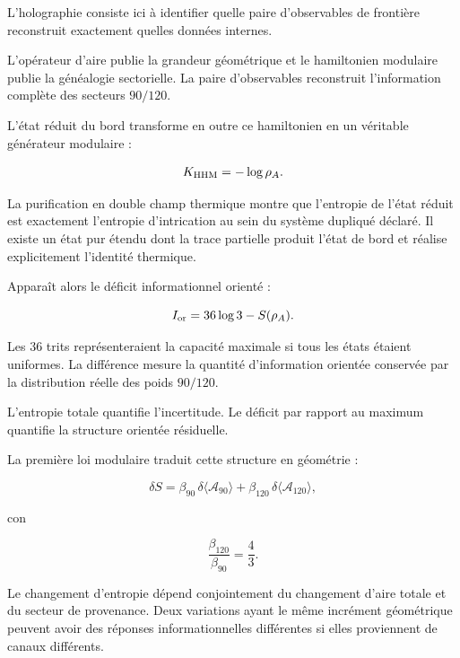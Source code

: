 L'holographie consiste ici à identifier quelle paire d'observables de frontière reconstruit exactement quelles données internes.\par

L'opérateur d'aire publie la grandeur géométrique et le hamiltonien modulaire publie la généalogie sectorielle. La paire d'observables reconstruit l'information complète des secteurs \(90/120\).\par

L'état réduit du bord transforme en outre ce hamiltonien en un véritable générateur modulaire :\par

\[
K_{\rm HHM}=-\log\rho_A.
\]

La purification en double champ thermique montre que l'entropie de l'état réduit est exactement l'entropie d'intrication au sein du système dupliqué déclaré. Il existe un état pur étendu dont la trace partielle produit l'état de bord et réalise explicitement l'identité thermique.\par

Apparaît alors le déficit informationnel orienté :\par

\[
I_{\rm or}
=
36\log3-S(\rho_A).
\]

Les \(36\) trits représenteraient la capacité maximale si tous les états étaient uniformes. La différence mesure la quantité d'information orientée conservée par la distribution réelle des poids \(90/120\).\par

L'entropie totale quantifie l'incertitude. Le déficit par rapport au maximum quantifie la structure orientée résiduelle.\par

La première loi modulaire traduit cette structure en géométrie :\par

\[
\delta S
=
\beta_{90}\,
\delta\langle\mathcal A_{90}\rangle
+
\beta_{120}\,
\delta\langle\mathcal A_{120}\rangle,
\]

con\par

\[
\frac{\beta_{120}}{\beta_{90}}
=
\frac43.
\]

Le changement d'entropie dépend conjointement du changement d'aire totale et du secteur de provenance. Deux variations ayant le même incrément géométrique peuvent avoir des réponses informationnelles différentes si elles proviennent de canaux différents.\par

